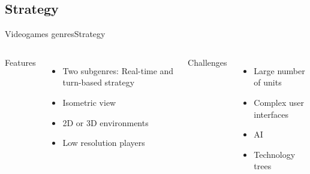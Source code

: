 \documentclass[10pt,compress]{beamer} %
\begin{document}
\subsection{Strategy}
\begin{frame}{Videogames genres}{Strategy}
	\vspace{-0.4cm}
    \begin{columns}
		Features
			\begin{itemize}
			\item Two subgenres: Real-time and turn-based strategy
			\item Isometric view
			\item 2D or 3D environments		
			\item Low resolution players
			\end{itemize}
	 	Challenges
			\begin{itemize}
			\item Large number of units
			\item Complex user interfaces
			\item AI
			\item Technology trees
			\end{itemize}


\end{columns}
\end{frame}
\end{document}
